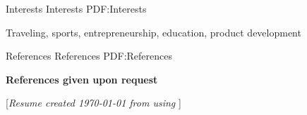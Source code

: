 \documentclass[letterpaper,MMMyyyy,nonstopmode]{resume}
\newcommand{\gitrevision}{%
  \StrLeft{\HEAD}{7}%
}
\newcommand{\CVNote}{Resume created {\today} from {\gitrevision} using {\XeLaTeX}}
\begin{document}
\begin{Body}

\Section
{Interests}
{Interests}
{PDF:Interests}

\Entry
Traveling, sports, entrepreneurship, education, product development


\Section
{References}
{References}
{PDF:References}

\BulletItem
\textbf{References given upon request}

\end{Body}


\BigGap
\UseNoteFont%
\null\hfill%
[\textit{\CVNote}]
\end{document}
